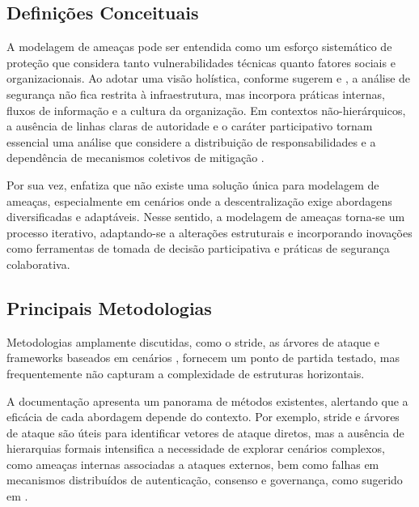 \subsection{Definições Conceituais} 
\label{sec:definicoes_conceituais}

A modelagem de ameaças pode ser entendida como um esforço sistemático de
proteção que considera tanto vulnerabilidades técnicas quanto fatores
sociais e organizacionais. Ao adotar uma visão holística, conforme sugerem
\cite{ThreatModelingAsABasisForSecurityRequirements} e
\cite{AdvancedThreatModeling}, a análise de segurança não fica restrita à
infraestrutura, mas incorpora práticas internas, fluxos de informação e a
cultura da organização. Em contextos não-hierárquicos, a ausência de linhas
claras de autoridade e o caráter participativo tornam essencial uma análise
que considere a distribuição de responsabilidades e a dependência de
mecanismos coletivos de mitigação \cite{Colbac}.

Por sua vez, \cite{DemystifyingTheThreatModelingProcess} enfatiza que não
existe uma solução única para modelagem de ameaças, especialmente em
cenários onde a descentralização exige abordagens diversificadas e
adaptáveis. Nesse sentido, a modelagem de ameaças torna-se um processo
iterativo, adaptando-se a alterações estruturais e incorporando inovações
como ferramentas de tomada de decisão participativa e práticas de segurança
colaborativa.


\subsection{Principais Metodologias}
\label{sec:principais_metodologias}

Metodologias amplamente discutidas, como o \gls{stride}, as árvores de
ataque e frameworks baseados em cenários
\cite{EvaluationofCompetingThreatModeling}, fornecem um ponto de partida
testado, mas frequentemente não capturam a complexidade de estruturas
horizontais.

A documentação \cite{ThreatModelingASummaryOfAvailableMethods} apresenta um
panorama de métodos existentes, alertando que a eficácia de cada abordagem
depende do contexto. Por exemplo, \gls{stride} e árvores de ataque são
úteis para identificar vetores de ataque diretos, mas a ausência de
hierarquias formais intensifica a necessidade de explorar cenários
complexos, como ameaças internas associadas a ataques externos, bem como
falhas em mecanismos distribuídos de autenticação, consenso e governança,
como sugerido em \cite{Colbac}.

